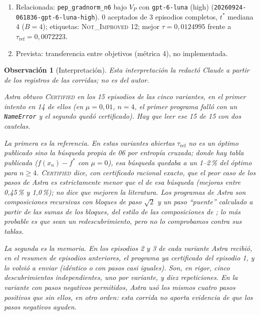 \documentclass[11pt,a4paper]{article}
\newtheorem{remark}{Observación}
\begin{document}
{\begin{enumerate}
  \item Relacionada: \texttt{pep\_\allowbreak{}gradnorm\_\allowbreak{}n6} bajo $V_P$ con \texttt{gpt-\allowbreak{}6-\allowbreak{}luna} (high) (\texttt{20260924-\allowbreak{}061836-\allowbreak{}gpt-\allowbreak{}6-\allowbreak{}luna-\allowbreak{}high}). 0 aceptados de 3 episodios completos, $t^*$ mediana $4$ ($B = 4$); etiquetas: \textsc{Not\_Improved} 12; mejor $\tau = 0{,}0124995$ frente a $\tau_{\mathrm{ref}} = 0{,}0072223$.
  \item Prevista: transferencia entre objetivos (métrica 4), no implementada.
\end{enumerate}
\par}

\begin{remark}[Interpretación]
Esta interpretación la redactó Claude a partir de los registros de las corridas; no es del autor.

Astra obtuvo \textsc{Certified} en los 15 episodios de las cinco variantes, en el primer intento en 14 de ellos (en $\mu = 0{,}01$, $n = 4$, el primer programa falló con un \texttt{NameError} y el segundo quedó certificado). Hay que leer ese 15 de 15 con dos cautelas.

La primera es la referencia. En estas variantes abiertas $\tau_{\mathrm{ref}}$ no es un óptimo publicado sino la búsqueda propia de 06 por entropía cruzada; donde hay tabla publicada ($f(x_n) - f^*$ con $\mu = 0$), esa búsqueda quedaba a un 1--2\,\% del óptimo para $n \ge 4$. \textsc{Certified} dice, con certificado racional exacto, que el peor caso de los pasos de Astra es estrictamente menor que el de esa búsqueda (mejoras entre 0{,}45\,\% y 1{,}0\,\%); no dice que mejoren la literatura. Los programas de Astra son composiciones recursivas con bloques de paso $\sqrt{2}$ y un paso ``puente'' calculado a partir de las sumas de los bloques, del estilo de las composiciones de \citet{GrimmerShuWang2024}; lo más probable es que sean un redescubrimiento, pero no lo comprobamos contra sus tablas.

La segunda es la memoria. En los episodios 2 y 3 de cada variante Astra recibió, en el resumen de episodios anteriores, el programa ya certificado del episodio 1, y lo volvió a enviar (idéntico o con pasos casi iguales). Son, en rigor, cinco descubrimientos independientes, uno por variante, y diez repeticiones. En la variante con pasos negativos permitidos, Astra usó los mismos cuatro pasos positivos que sin ellos, en otro orden: esta corrida no aporta evidencia de que los pasos negativos ayuden.
\end{remark}


\end{document}

